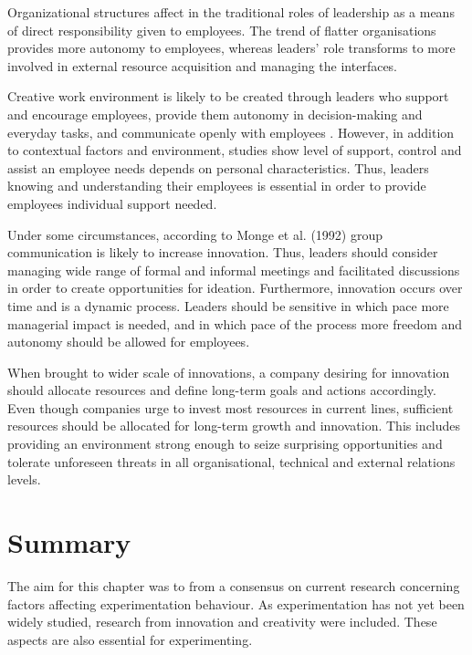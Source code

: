 Organizational structures affect in the traditional roles of leadership as a means of direct responsibility given to employees. The trend of flatter organisations provides more autonomy to employees, whereas leaders' role transforms to more involved in external resource acquisition and managing the interfaces. \citep{shalley2004leaders}

Creative work environment is likely to be created through leaders who support and encourage employees, provide them autonomy in decision-making and everyday tasks, and communicate openly with employees \citep{oldham1996employee,tierney1999examination}. However, in addition to contextual factors and environment, studies show level of support, control and assist an employee needs depends on personal characteristics. Thus, leaders knowing and understanding their employees is essential in order to provide employees individual support needed. \citep{shalley2004leaders}

Under some circumstances, according to Monge et al. (1992) \citet{monge1992communication} group communication is likely to increase innovation. Thus, leaders should consider managing wide range of formal and informal meetings and facilitated discussions in order to create opportunities for ideation. Furthermore, innovation occurs over time and is a dynamic process. Leaders should be sensitive in which pace more managerial impact is needed, and in which pace of the process more freedom and autonomy should be allowed for employees. \citep{monge1992communication} 

When brought to wider scale of innovations, a company desiring for innovation should allocate resources and define long-term goals and actions accordingly. Even though companies urge to invest most resources in current lines, sufficient resources should be allocated for long-term growth and innovation. This includes providing an environment strong enough to seize surprising opportunities and tolerate unforeseen threats in all organisational, technical and external relations levels. \citep{quinn1985managing} 


\section{Summary}
The aim for this chapter was to from a consensus on current research concerning factors affecting experimentation behaviour. As experimentation has not yet been widely studied, research from innovation and creativity were included. These aspects are also essential for experimenting.  

